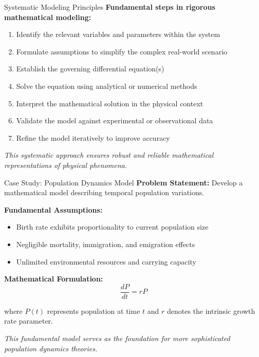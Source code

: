 \documentclass[10pt,aspectratio=169]{beamer}
\newcommand{\concept}[1]{\textcolor{mDarkTeal}{\textbf{#1}}}
\newcommand{\emphasis}[1]{\textit{#1}}
\begin{document}
\begin{frame}{Systematic Modeling Principles}
    \concept{Fundamental steps in rigorous mathematical modeling:}
    
    \vspace{0.3cm}
    
    \begin{enumerate}
        \item Identify the relevant variables and parameters within the system
        \item Formulate assumptions to simplify the complex real-world scenario
        \item Establish the governing differential equation(s)
        \item Solve the equation using analytical or numerical methods
        \item Interpret the mathematical solution in the physical context
        \item Validate the model against experimental or observational data
        \item Refine the model iteratively to improve accuracy
    \end{enumerate}
    
    \vspace{0.3cm}
    
    \emphasis{This systematic approach ensures robust and reliable mathematical representations of physical phenomena.}
\end{frame}

\begin{frame}{Case Study: Population Dynamics Model}
    \concept{Problem Statement:} Develop a mathematical model describing temporal population variations.
    
    \vspace{0.3cm}
    
    \concept{Fundamental Assumptions:}
    \begin{itemize}
        \item Birth rate exhibits proportionality to current population size
        \item Negligible mortality, immigration, and emigration effects
        \item Unlimited environmental resources and carrying capacity
    \end{itemize}
    
    \vspace{0.3cm}
    
    \concept{Mathematical Formulation:}
    \begin{equation}
        \frac{dP}{dt} = rP
    \end{equation}
    
    where $P(t)$ represents population at time $t$ and $r$ denotes the intrinsic growth rate parameter.
    
    \vspace{0.2cm}
    
    \emphasis{This fundamental model serves as the foundation for more sophisticated population dynamics theories.}
\end{frame}
\end{document}
